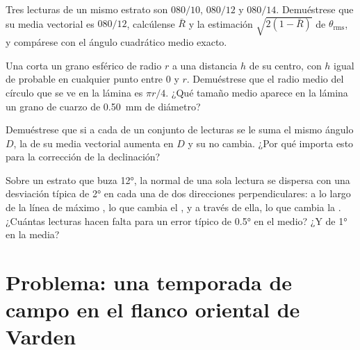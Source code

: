 \begin{exercise}[$\star\star$]\label{exo:b1:field-lab-methods-1:9}
Tres lecturas de un mismo estrato son $080/10$, $080/12$ y $080/14$. Demuéstrese que su media vectorial es
$080/12$, calcúlense $\bar R$ y la estimación $\sqrt{2(1 - \bar R)}$ de $\theta_{\text{rms}}$, y compárese
con el ángulo cuadrático medio exacto.
\end{exercise}

\begin{exercise}[$\star\star\star$]\label{exo:b1:field-lab-methods-1:10}
Una  corta un grano esférico de radio $r$ a una distancia $h$ de su centro, con $h$ igual
de probable en cualquier punto entre 0 y $r$. Demuéstrese que el radio medio del círculo que se ve en la
lámina es $\pi r/4$. ¿Qué tamaño medio aparece en la lámina un grano de cuarzo de \qty{0.50}{mm} de diámetro?
\end{exercise}

\begin{exercise}[$\star\star\star$]\label{exo:b1:field-lab-methods-1:11}
Demuéstrese que si a cada  de un conjunto de lecturas se le suma el mismo ángulo
$D$, la  de su media vectorial aumenta en $D$ y su  no cambia. ¿Por qué
importa esto para la corrección de la declinación?
\end{exercise}

\begin{exercise}[$\star\star\star$]\label{exo:b1:field-lab-methods-1:12}
Sobre un estrato que buza \ang{12}, la normal de una sola lectura se dispersa con una desviación típica de
\ang{2} en cada una de dos direcciones perpendiculares: a lo largo de la línea de máximo , lo que
cambia el , y a través de ella, lo que cambia la . ¿Cuántas lecturas hacen
falta para un error típico de \ang{0.5} en el  medio? ¿Y de \ang{1} en la  media?
\end{exercise}

\section{Problema: una temporada de campo en el flanco oriental de Varden}

